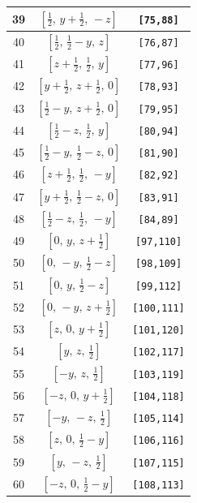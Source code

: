 \documentclass[fleqn,8pt]{jsarticle}
\begin{document}
\begin{longtable}{ccc}
39 & $\left[ \frac{1}{2},\, y + \frac{1}{2},\, - z \right]$ & {\tt [75,88]} \\ \hline
40 & $\left[ \frac{1}{2},\, \frac{1}{2} - y,\, z \right]$ & {\tt [76,87]} \\ \hline
41 & $\left[ z + \frac{1}{2},\, \frac{1}{2},\, y \right]$ & {\tt [77,96]} \\ \hline
42 & $\left[ y + \frac{1}{2},\, z + \frac{1}{2},\, 0 \right]$ & {\tt [78,93]} \\ \hline
43 & $\left[ \frac{1}{2} - y,\, z + \frac{1}{2},\, 0 \right]$ & {\tt [79,95]} \\ \hline
44 & $\left[ \frac{1}{2} - z,\, \frac{1}{2},\, y \right]$ & {\tt [80,94]} \\ \hline
45 & $\left[ \frac{1}{2} - y,\, \frac{1}{2} - z,\, 0 \right]$ & {\tt [81,90]} \\ \hline
46 & $\left[ z + \frac{1}{2},\, \frac{1}{2},\, - y \right]$ & {\tt [82,92]} \\ \hline
47 & $\left[ y + \frac{1}{2},\, \frac{1}{2} - z,\, 0 \right]$ & {\tt [83,91]} \\ \hline
48 & $\left[ \frac{1}{2} - z,\, \frac{1}{2},\, - y \right]$ & {\tt [84,89]} \\ \hline
49 & $\left[ 0,\, y,\, z + \frac{1}{2} \right]$ & {\tt [97,110]} \\ \hline
50 & $\left[ 0,\, - y,\, \frac{1}{2} - z \right]$ & {\tt [98,109]} \\ \hline
51 & $\left[ 0,\, y,\, \frac{1}{2} - z \right]$ & {\tt [99,112]} \\ \hline
52 & $\left[ 0,\, - y,\, z + \frac{1}{2} \right]$ & {\tt [100,111]} \\ \hline
53 & $\left[ z,\, 0,\, y + \frac{1}{2} \right]$ & {\tt [101,120]} \\ \hline
54 & $\left[ y,\, z,\, \frac{1}{2} \right]$ & {\tt [102,117]} \\ \hline
55 & $\left[ - y,\, z,\, \frac{1}{2} \right]$ & {\tt [103,119]} \\ \hline
56 & $\left[ - z,\, 0,\, y + \frac{1}{2} \right]$ & {\tt [104,118]} \\ \hline
57 & $\left[ - y,\, - z,\, \frac{1}{2} \right]$ & {\tt [105,114]} \\ \hline
58 & $\left[ z,\, 0,\, \frac{1}{2} - y \right]$ & {\tt [106,116]} \\ \hline
59 & $\left[ y,\, - z,\, \frac{1}{2} \right]$ & {\tt [107,115]} \\ \hline
60 & $\left[ - z,\, 0,\, \frac{1}{2} - y \right]$ & {\tt [108,113]} \\ \hline

\end{longtable}
\end{document}
